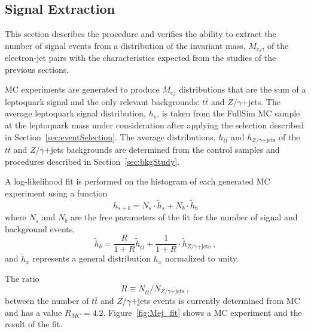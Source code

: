 \documentclass{cmspaper}
\begin{document}
\begin{linenumbers}
\section{Signal Extraction} \label{sec:signalExtraction}

This section describes the procedure and verifies the ability to extract the 
number of signal events from a distribution of the invariant mass, $M_{ej}$, of the 
electron-jet pairs with the characteristics expected from the studies 
of the previous sections.

MC experiments are generated to produce $M_{ej}$ distributions that are the sum
of a leptoquark signal and the only relevant backgrounds: $t\bar{t}$ and $Z/\gamma$+jets.
The average leptoquark signal distribution, $h_s$, is taken from the FullSim MC 
sample at the leptoquark mass under consideration after applying the selection
described in Section~\ref{sec:eventSelection}.
The average distributions, $h_{t\bar{t}}$ and $h_{Z/\gamma\mathrm{+jets}}$ 
of the $t\bar{t}$ and $Z/\gamma$+jets backgrounds are determined from the control samples
and procedures described in Section~\ref{sec:bkgStudy}.

A log-likelihood fit is performed on the histogram of each generated MC experiment
using a function
\begin{displaymath}
  h_{s+b} = N_s \cdot \tilde{h}_s + N_b \cdot \tilde{h}_b
\end{displaymath}
where $N_s$ and $N_b$ are the free parameters of the fit for the number of signal and background events,
\begin{displaymath}
  \tilde{h}_b = \frac{R}{1+R} \tilde{h}_{t\bar{t}} + \frac{1}{1+R} \cdot \tilde{h}_{Z/\gamma\mathrm{+jets}}~\mathrm{,}
\end{displaymath}
and $\tilde{h}_x$ represents a general distribution $h_x$ normalized to unity. 

The ratio
\begin{displaymath}
  R \equiv N_{t\bar{t}} / N_{Z/\gamma\mathrm{+jets}}~\mathrm{,}
\end{displaymath}
between the number of $t\bar{t}$ and $Z/\gamma$+jets events is currently determined from 
MC and has a value $R_{MC}=4.2$.
Figure~\ref{fig:Mej_fit} shows a MC experiment and the result of the fit.


\end{linenumbers}
\end{document}
